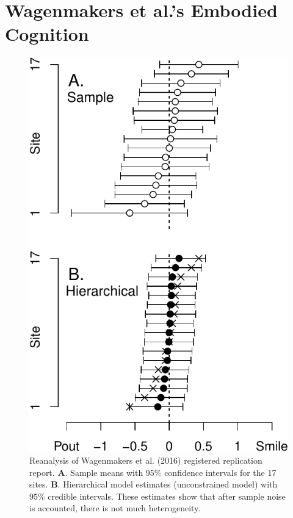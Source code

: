 \documentclass[english,man]{apa6}
\theoremstyle{definition}
\theoremstyle{definition}
\theoremstyle{definition}
\theoremstyle{remark}
\begin{document}
\section{Wagenmakers et al.'s Embodied
Cognition}\label{wagenmakers-et-al.s-embodied-cognition}

\begin{figure}[htbp]
\centering
\includegraphics{p_files/figure-latex/wagEst-1.pdf}
\caption{\label{fig:wagEst}Reanalysis of Wagenmakers et al. (2016)
registered replication report. \textbf{A}. Sample means with 95\%
confidence intervals for the 17 sites. \textbf{B}. Hierarchical model
estimates (unconstrained model) with 95\% credible intervals. These
estimates show that after sample noise is accounted, there is not much
heterogeneity.}
\end{figure}
\end{document}
